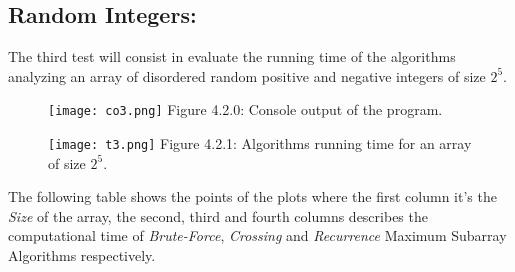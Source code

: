 \subsection{Random Integers:}

The third test will consist in evaluate the running time of the algorithms analyzing an array of disordered random positive and negative integers of size $2^{5}$. \hfill \break

\begin{figure}[H]
\texttt{[image: co3.png]}
\centering \linebreak \linebreak Figure 4.2.0: Console output of the program.
\end{figure} \hfill 

\begin{figure}[H]
\texttt{[image: t3.png]}
\centering \linebreak \linebreak Figure 4.2.1: Algorithms running time for an array of size $2^{5}$.
\end{figure} \hfill 

The following table shows the points of the plots where the first column it's the {\itshape Size} of the array, the second, third and fourth columns describes the computational time of {\itshape Brute-Force}, {\itshape Crossing} and {\itshape Recurrence} Maximum Subarray Algorithms respectively. \hfill \break

